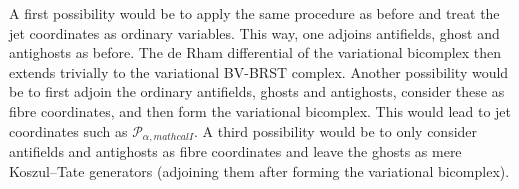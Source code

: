
    A first possibility would be to apply the same procedure as before and treat the jet coordinates as ordinary variables. This way, one adjoins antifields, ghost and antighosts as before. The de Rham differential of the variational bicomplex then extends trivially to the variational BV-BRST complex. Another possibility would be to first adjoin the ordinary antifields, ghosts and antighosts, consider these as fibre coordinates, and then form the variational bicomplex. This would lead to jet coordinates such as $\mathcal{P}_{\alpha,mathcal{I}}$. A third possibility would be to only consider antifields and antighosts as fibre coordinates and leave the ghosts as mere Koszul--Tate generators (adjoining them after forming the variational bicomplex).